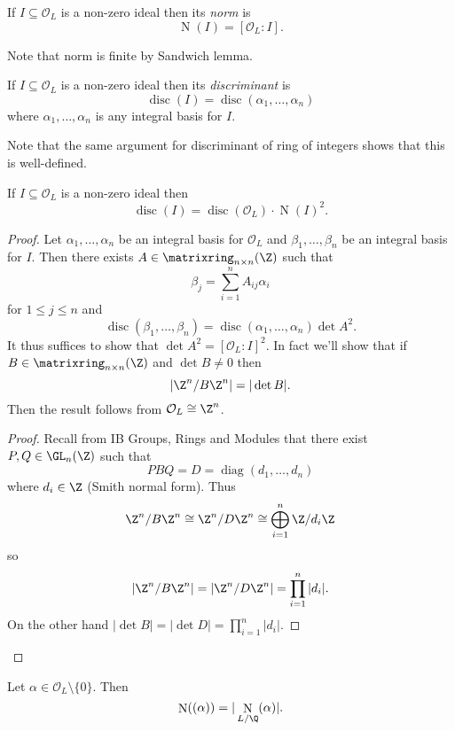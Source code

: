 \documentclass[a4paper]{article}
\renewcommand*{\O}{\mathcal{O}}
\DeclareMathOperator{\n}{N}
\DeclareMathOperator{\disc}{disc}
\begin{document}
\begin{definition}[Norm]
  If \(I \subseteq \O_L\) is a non-zero ideal then its \emph{norm} is
  \[
    \n(I) = [\O_L:I].
  \]
\end{definition}

Note that norm is finite by Sandwich lemma.

\begin{definition}[Discriminant]
  If \(I \subseteq \O_L\) is a non-zero ideal then its \emph{discriminant} is
  \[
    \disc(I) = \disc(\alpha_1, \dots, \alpha_n)
  \]
  where \(\alpha_1, \dots, \alpha_n\) is any integral basis for \(I\).
\end{definition}

Note that the same argument for discriminant of ring of integers shows that this is well-defined.

\begin{lemma}
  If \(I \subseteq \O_L\) is a non-zero ideal then
  \[
    \disc(I) = \disc(\O_L) \cdot \n(I)^2.
  \]
\end{lemma}

\begin{proof}
  Let \(\alpha_1, \dots, \alpha_n\) be an integral basis for \(\O_L\) and \(\beta_1, \dots, \beta_n\) be an integral basis for \(I\). Then there exists \(A \in \matrixring_{n \times n}(\Z)\) such that
  \[
    \beta_j = \sum_{i = 1}^n A_{ij}\alpha_i
  \]
  for \(1 \leq j \leq n\) and
  \[
    \disc(\beta_1, \dots, \beta_n) = \disc(\alpha_1, \dots, \alpha_n) \det A^2.
  \]
  It thus suffices to show that \(\det A^2 = [\O_L:I]^2\). In fact we'll show that if \(B \in \matrixring_{n \times n}(\Z)\) and \(\det B \neq 0\) then
  \[
    |\Z^n/B\Z^n| = |\det B|.
  \]
  Then the result follows from \(\O_L \cong \Z^n\).

  \begin{proof}
    Recall from IB Groups, Rings and Modules that there exist \(P, Q \in \GL_n(\Z)\) such that
    \[
      PBQ = D = \operatorname{diag}(d_1, \dots, d_n)
    \]
    where \(d_i \in \Z\) (Smith normal form). Thus
    \[
      \Z^n/B\Z^n \cong \Z^n/D\Z^n \cong \bigoplus_{i = 1}^n \Z/d_i\Z
    \]
    so
    \[
      |\Z^n/B\Z^n| = |\Z^n/D\Z^n| = \prod_{i = 1}^n |d_i|.
    \]
    On the other hand \(|\det B| = |\det D| = \prod_{i = 1}^n |d_i|\).
  \end{proof}
\end{proof}

\begin{lemma}
  Let \(\alpha \in \O_L \setminus \{0\}\). Then
  \[
    \n((\alpha)) = |\n_{L/\Q}(\alpha)|.
  \]
\end{lemma}
\end{document}
